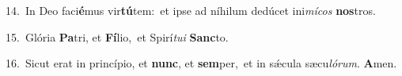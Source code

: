 {\numbfont\textcolor{\numbcolor}{14.}}~In Deo faci\-\textbf{é}\-mus vir\-\textbf{tú}\-tem:~\star et ipse ad níhilum dedúcet ini\-\textit{mí}\-\textit{cos} \textbf{nos}\-tros.\par
{\numbfont\textcolor{\numbcolor}{15.}}~Glória \textbf{Pa}\-tri, et \textbf{Fí}\-lio,~\star et Spirí\-\textit{tu}\-\textit{i} \textbf{Sanc}\-to.\par
{\numbfont\textcolor{\numbcolor}{16.}}~Sicut erat in princípio, et \textbf{nunc}\-, et \textbf{sem}\-per,~\star et in sǽcula sæcu\-\textit{ló}\-\textit{rum}. \textbf{A}\-men.\par
